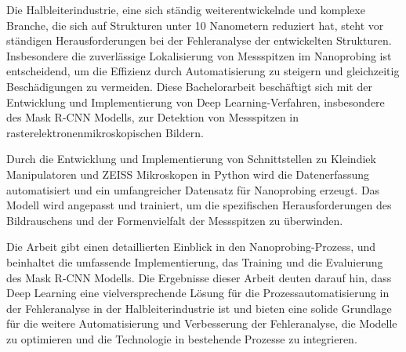 Die Halbleiterindustrie, eine sich ständig weiterentwickelnde und komplexe Branche, die sich auf Strukturen unter 10 Nanometern reduziert hat, steht vor ständigen Herausforderungen bei der Fehleranalyse der entwickelten Strukturen. Insbesondere die zuverlässige Lokalisierung von Messspitzen im Nanoprobing ist entscheidend, um die Effizienz durch Automatisierung zu steigern und gleichzeitig Beschädigungen zu vermeiden. Diese Bachelorarbeit beschäftigt sich mit der Entwicklung und Implementierung von Deep Learning-Verfahren, insbesondere des Mask R-CNN Modells, zur Detektion von Messspitzen in rasterelektronenmikroskopischen Bildern.

Durch die Entwicklung und Implementierung von Schnittstellen zu Kleindiek Manipulatoren und ZEISS Mikroskopen in Python wird die Datenerfassung automatisiert und ein umfangreicher Datensatz für Nanoprobing erzeugt. Das Modell wird angepasst und trainiert, um die spezifischen Herausforderungen des Bildrauschens und der Formenvielfalt der Messspitzen zu überwinden.

Die Arbeit gibt einen detaillierten Einblick in den Nanoprobing-Prozess, und beinhaltet die umfassende Implementierung, das Training und die Evaluierung des Mask R-CNN Modells. Die Ergebnisse dieser Arbeit deuten darauf hin, dass Deep Learning eine vielversprechende Lösung für die Prozessautomatisierung in der Fehleranalyse in der Halbleiterindustrie ist und bieten eine solide Grundlage für die weitere Automatisierung und Verbesserung der Fehleranalyse, die Modelle zu optimieren und die Technologie in bestehende Prozesse zu integrieren.
